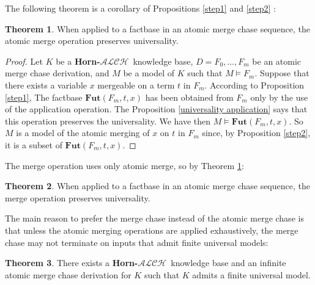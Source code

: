 \documentclass{article}
\theoremstyle{definition}
\newtheorem{theorem}{Theorem}[section]
\theoremstyle{remark}
\newcommand{\Fut}{\textbf{Fut}}
\newcommand{\ALCH}{\textbf{Horn-$\mathcal{ALCH}$}}
\begin{document}
The following theorem is a corollary of Propositions \ref{step1} and \ref{step2} :

\begin{theorem} \label{universality atomic merge}
When applied to a factbase in an atomic merge chase sequence, the atomic merge operation preserves universality.
\end{theorem}

\begin{proof}
Let $K$ be a \ALCH\ knowledge base, $D=F_0,\ldots, F_m$ be an atomic merge chase derivation, and $M$ be a model of $K$ such that $M \models F_m$. Suppose that there exists a variable $x$ mergeable on a term $t$ in $F_m$. According to Proposition \ref{step1}, The factbase $\Fut(F_m,t,x)$ has been obtained from $F_m$ only by the use of the application operation. The Proposition \ref{universality application} says that this operation preserves the universality. We have then $M \models \Fut(F_m,t,x)$. So $M$ is a model of the atomic merging of $x$ on $t$ in $F_m$ since, by Proposition \ref{step2}, it is a subset of $\Fut(F_m,t,x)$.
\end{proof}





The merge operation uses only atomic merge, so by Theorem \ref{universality atomic merge}:

\begin{theorem} \label{universality merge}
When applied to a factbase in an atomic merge chase sequence, the merge operation preserves universality.
\end{theorem}


The main reason to prefer the merge chase instead of the atomic merge chase is that unless the atomic merging operations are applied exhaustively, the merge chase may not terminate on inputs that admit finite universal models:


\begin{theorem} \label{necessity of atomic merge}
There exists a \ALCH\ knowledge base and an infinite atomic merge chase derivation for $K$ such that $K$ admits a finite universal model.
\end{theorem}
\end{document}

